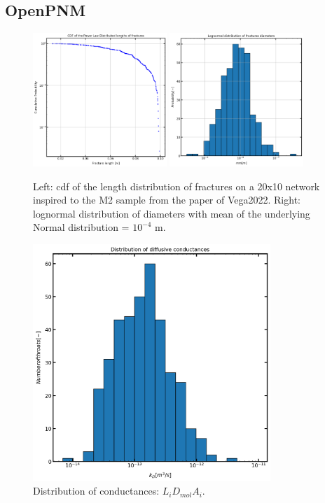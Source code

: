 \documentclass{article}
\begin{document}
\subsection{OpenPNM}
\begin{figure}[htbp!]
    \centering
    \includegraphics[width=0.45\textwidth]{images/fromOpenPNM/cdfLengths.png}
    \hspace{0.05\textwidth}
    \includegraphics[width=0.45\textwidth]{images/fromOpenPNM/diametersDist.png}
    \caption{Left: cdf of the length distribution of fractures on a 20x10 network inspired to the M2 sample from the paper of Vega2022. Right: lognormal distribution of diameters with mean of the underlying Normal distribution = $10^{-4}$ m.}
    \label{fig:LengthDist}
\end{figure}

\begin{figure}[htbp]
    \centering
    \includegraphics[width=0.8\textwidth]{images/fromOpenPNM/conductancesDist.png}
    \caption{Distribution of conductances: $L_iD_{mol}A_i$.}
    \label{fig:ConductanceDist}
\end{figure}
\end{document}
